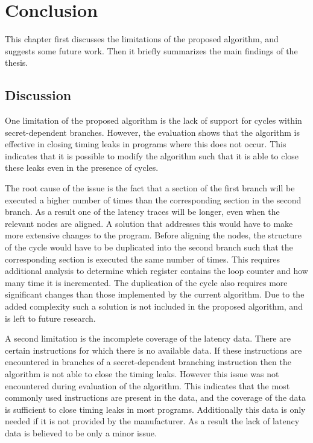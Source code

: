\chapter{Conclusion}
\label{cha:conclusion}
This chapter first discusses the limitations of the proposed algorithm, and suggests some future work. Then it briefly summarizes the main findings of the thesis. 

\section{Discussion}
One limitation of the proposed algorithm is the lack of support for cycles within secret-dependent branches.
However, the evaluation shows that the algorithm is effective in closing timing leaks in programs where this does not occur. 
This indicates that it is possible to modify the algorithm such that it is able to close these leaks even in the presence of cycles. 

The root cause of the issue is the fact that a section of the first branch will be executed a higher number of times than the corresponding section in the second branch. 
As a result one of the latency traces will be longer, even when the relevant nodes are aligned.
A solution that addresses this would have to make more extensive changes to the program. 
Before aligning the nodes, the structure of the cycle would have to be duplicated into the second branch such that the corresponding section is executed the same number of times. 
This requires additional analysis to determine which register contains the loop counter and how many time it is incremented. 
The duplication of the cycle also requires more significant changes than those implemented by the current algorithm.
Due to the added complexity such a solution is not included in the proposed algorithm, and is left to future research. 

A second limitation is the incomplete coverage of the latency data. There are certain instructions for which there is no available data. 
If these instructions are encountered in branches of  a secret-dependent branching instruction then the algorithm is not able to close the timing leaks. 
However this issue was not encountered during evaluation of the algorithm. 
This indicates that the most commonly used instructions are present in the data, and the coverage of the data is sufficient to close timing leaks in most programs. 
Additionally this data is only needed if it is not provided by the manufacturer. 
As a result the lack of latency data is believed to be only a minor issue.  

